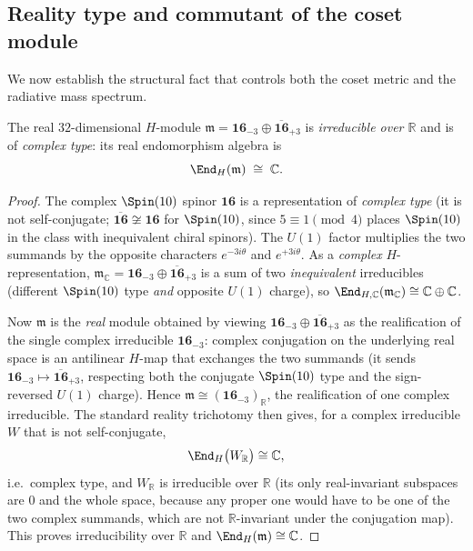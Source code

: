 \subsection{Reality type and commutant of the coset module}
\label{sec:app-spectrum:reality}

We now establish the structural fact that controls both the coset metric
and the radiative mass spectrum.

\begin{theorem}
\label{thm:app-spectrum:complextype}
The real $32$-dimensional $H$-module
$\mathfrak m=\mathbf{16}_{-3}\oplus\overline{\mathbf{16}}_{+3}$ is
\emph{irreducible over $\mathbb R$} and is of \emph{complex type}: its
real endomorphism algebra is
\[
  \End_H(\mathfrak m)\;\cong\;\mathbb C .
\]
\end{theorem}

\begin{proof}
The complex $\Spin(10)$ spinor $\mathbf{16}$ is a representation of
\emph{complex type} (it is not self-conjugate;
$\overline{\mathbf{16}}\not\cong\mathbf{16}$ for $\Spin(10)$, since
$5\equiv1\pmod 4$ places $\Spin(10)$ in the class with inequivalent chiral
spinors). The $U(1)$ factor multiplies the two summands by the opposite
characters $e^{-3i\theta}$ and $e^{+3i\theta}$. As a \emph{complex}
$H$-representation, $\mathfrak m_{\mathbb C}=\mathbf{16}_{-3}\oplus
\overline{\mathbf{16}}_{+3}$ is a sum of two \emph{inequivalent}
irreducibles (different $\Spin(10)$ type \emph{and} opposite $U(1)$
charge), so $\End_{H,\mathbb C}(\mathfrak m_{\mathbb C})\cong
\mathbb C\oplus\mathbb C$.

Now $\mathfrak m$ is the \emph{real} module obtained by viewing
$\mathbf{16}_{-3}\oplus\overline{\mathbf{16}}_{+3}$ as the realification
of the single complex irreducible $\mathbf{16}_{-3}$: complex conjugation
on the underlying real space is an antilinear $H$-map that exchanges the
two summands (it sends $\mathbf{16}_{-3}\mapsto\overline{\mathbf{16}}_{+3}$,
respecting both the conjugate $\Spin(10)$ type and the sign-reversed
$U(1)$ charge). Hence $\mathfrak m\cong(\mathbf{16}_{-3})_{\mathbb R}$,
the realification of one complex irreducible. The standard reality
trichotomy then gives, for a complex irreducible $W$ that is not
self-conjugate,
\[
  \End_H\bigl(W_{\mathbb R}\bigr)\cong\mathbb C ,
\]
i.e.\ complex type, and $W_{\mathbb R}$ is irreducible over $\mathbb R$
(its only real-invariant subspaces are $0$ and the whole space, because
any proper one would have to be one of the two complex summands, which are
not $\mathbb R$-invariant under the conjugation map). This proves
irreducibility over $\mathbb R$ and $\End_H(\mathfrak m)\cong\mathbb C$.
\end{proof}

